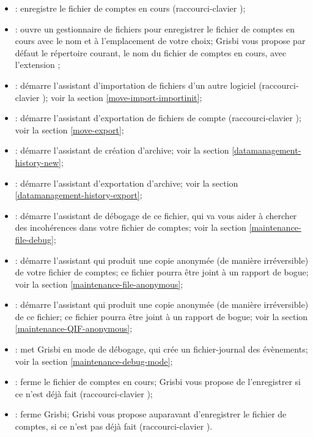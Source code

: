 \begin{itemize}
	\item {}: enregistre le fichier de comptes en cours (raccourci-clavier );
	\item {}: ouvre un gestionnaire de fichiers pour enregistrer le fichier de comptes en cours avec le nom et à l'emplacement de votre choix; Grisbi vous propose par défaut le répertoire courant, le nom du fichier de comptes en cours, avec l'\gls{extension} ;
	\item {}: démarre l'assistant d'importation de fichiers d'un autre logiciel (raccourci-clavier ); voir la section \vref{move-import-importinit};
	\item {}: démarre l'assistant d'exportation de fichiers de compte (raccourci-clavier ); voir la section \vref{move-export};	
	\item {}: démarre l'assistant de création d'archive; voir la section \vref{datamanagement-history-new};	
	\item {}: démarre l'assistant d'exportation d'archive; voir la section \vref{datamanagement-history-export};
	\item {}: démarre l'assistant de débogage de ce fichier, qui va vous aider à chercher des incohérences dans votre fichier de comptes; voir la section \vref{maintenance-file-debug};
	\item {}: démarre l'assistant qui produit une copie anonymée (de manière irréversible) de votre fichier de comptes; ce fichier pourra être joint à un rapport de bogue; voir la section \vref{maintenance-file-anonymous};	
	\item {}: démarre l'assistant qui produit une copie anonymée (de manière irréversible) de ce fichier; ce fichier pourra être joint à un rapport de bogue; voir la section \vref{maintenance-QIF-anonymous};	
	\item {}: met Grisbi en mode de débogage, qui crée un fichier-journal des évènements; voir la section \vref{maintenance-debug-mode}; 	
	\item {}: ferme le fichier de comptes en cours; Grisbi vous propose de l'enregistrer si ce n'est déjà fait (raccourci-clavier );
	\item {}: ferme Grisbi; Grisbi vous propose auparavant d'enregistrer le fichier de comptes, si ce n'est pas déjà fait (raccourci-clavier ).
\end{itemize}


